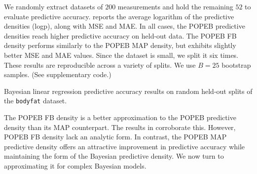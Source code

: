 We randomly extract datasets of $200$ measurements and hold the
remaining $52$ to evaluate predictive accuracy.  reports
the average logarithm of the predictive densities (logp), along with \gls{MSE}
and
\gls{MAE}. In all cases, the \gls{POPEB} predictive densities reach higher
predictive accuracy on held-out data. The \gls{POPEB} \gls{FB} density
performs similarly to the \gls{POPEB} \gls{MAP} density, but exhibits
slightly better \gls{MSE} and \gls{MAE} values.
Since the dataset is small, we split it six times.
These results are reproducible across a variety of splits.
We use $B=25$ bootstrap samples. (See supplementary
code.)

\begin{table}[t]
\caption{Bayesian linear regression predictive accuracy results on
random held-out splits of the \texttt{bodyfat} dataset.}
\label{tab:blr}
\begin{center}
{\fontsize{8pt}{9pt}\selectfont

}
\end{center}
\end{table}

The \gls{POPEB} \gls{FB} density is a better approximation to the \gls{POPEB}
predictive density than its \gls{MAP} counterpart. The results in 
corroborate this. However, \gls{POPEB} \gls{FB} density lack an analytic form.
In contrast, the \gls{POPEB} \gls{MAP} predictive density offers an attractive
improvement in predictive accuracy while maintaining the form of the Bayesian
predictive density. We now turn to approximating it for complex Bayesian models.
